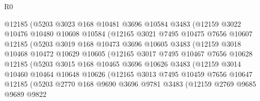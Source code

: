 \begin{lexlean}{R0}
\begin{coremodule}
                  @12185
                  (@5203
                    @3023
                    @168
                    @10481
                    @3696
                    @10584
                    @3483
                    (@12159
                      @3022
                      @10476
                      @10480
                      @10608
                      @10584
                      (@12165
                        @3021
                        @7495
                        @10475
                        @7656
                        @10607
                        @12185
                        (@5203
                          @3019
                          @168
                          @10473
                          @3696
                          @10605
                          @3483
                          (@12159
                            @3018
                            @10468
                            @10472
                            @10629
                            @10605
                            (@12165
                              @3017
                              @7495
                              @10467
                              @7656
                              @10628
                              @12185
                              (@5203
                                @3015
                                @168
                                @10465
                                @3696
                                @10626
                                @3483
                                (@12159
                                  @3014
                                  @10460
                                  @10464
                                  @10648
                                  @10626
                                  (@12165
                                    @3013
                                    @7495
                                    @10459
                                    @7656
                                    @10647
                                    @12185
                                    (@5203
                                      @2770
                                      @168
                                      @9690
                                      @3696
                                      @9781
                                      @3483
                                      (@12159
                                        @2769
                                        @9685
                                        @9689
                                        @9822

\end{coremodule}
\end{lexlean}

